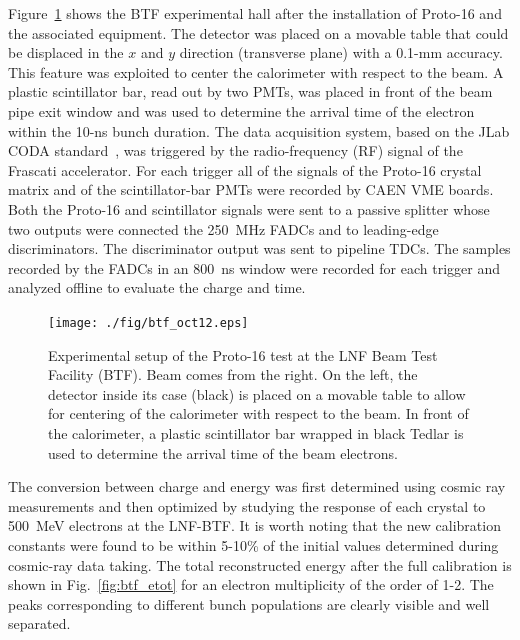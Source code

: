 Figure~\ref{fig:btf} shows the BTF experimental hall after the installation of Proto-16 and the associated equipment.
The detector was placed on a movable table that could be displaced in the $x$ and $y$ direction (transverse
plane) with a 0.1-mm accuracy. This feature was exploited to center the calorimeter with respect to the beam. A
plastic scintillator bar, read out by two PMTs, was placed in front of the beam pipe exit window and was used to
determine the arrival time of the electron within the 10-ns bunch duration. The data acquisition system, based on the
JLab CODA standard~\cite{daq}, was triggered by the radio-frequency (RF) signal of the Frascati accelerator. For
each trigger all of the signals of the Proto-16 crystal matrix and of the scintillator-bar PMTs were recorded by
CAEN VME boards. Both the Proto-16 and scintillator signals were sent to a passive splitter whose two outputs were
connected the 250~MHz FADCs and to leading-edge discriminators. The discriminator output was sent to pipeline
TDCs. The samples recorded by the FADCs in an 800~ns window were recorded for each trigger and analyzed offline
to evaluate the charge and time.

\begin{figure}
\texttt{[image: ./fig/btf\_oct12.eps]}
\caption{Experimental setup of the Proto-16 test at the LNF Beam Test Facility (BTF). Beam comes from the right.
  On the left, the detector inside its case (black) is placed on a movable table to allow for centering of the calorimeter
  with respect to the beam. In front of the calorimeter, a plastic scintillator bar wrapped in black Tedlar is used to
  determine the arrival time of the beam electrons.}
\label{fig:btf}
\end{figure}

The conversion between charge and energy was first determined using cosmic ray measurements and then optimized
by studying the response of each crystal to 500~MeV electrons at the LNF-BTF. It is worth noting that the new
calibration constants were found to be within 5-10\% of the initial values determined during cosmic-ray data
taking. The total reconstructed energy  after the full calibration is shown in Fig.~\ref{fig:btf_etot} for an electron
multiplicity of the order of 1-2. The peaks corresponding to different bunch populations are clearly visible and well
separated. 

